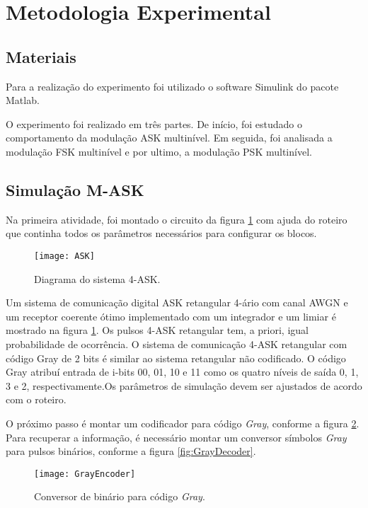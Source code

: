\newpage
\section{Metodologia Experimental}

\subsection{Materiais}

Para a realização do experimento foi utilizado o software Simulink do pacote Matlab.

O experimento foi realizado em três partes. De início, foi estudado o comportamento da modulação ASK multinível. Em seguida, foi analisada a modulação FSK multinível e por ultimo, a modulação PSK multinível.

\subsection{Simulação M-ASK}
Na primeira atividade, foi montado o circuito da figura \ref{fig:ASK} com ajuda do roteiro que continha todos os parâmetros necessários para configurar os blocos.

\begin{figure}[H]
    \centering
    \texttt{[image: ASK]}
    \caption{Diagrama do sistema 4-ASK.}
    \label{fig:ASK}
\end{figure}

Um sistema de comunicação digital ASK retangular 4-ário com canal AWGN e um receptor coerente ótimo implementado com um integrador e um limiar é mostrado na figura \ref{fig:ASK}. Os pulsos 4-ASK retangular tem, a priori, igual probabilidade de ocorrência.
O sistema de comunicação 4-ASK retangular com código Gray de 2 bits é similar ao sistema retangular não codificado. O código Gray atribuí entrada de i-bits 00, 01, 10 e 11 como os quatro níveis de saída 0, 1, 3 e 2, respectivamente.Os parâmetros de simulação devem ser ajustados de acordo com o roteiro.

O próximo passo é montar um codificador para código \textit{Gray}, conforme a figura \ref{fig:GrayEncoder}.
Para recuperar a informação, é necessário montar um conversor símbolos \textit{Gray} para pulsos binários, conforme a figura \ref{fig:GrayDecoder}.

\begin{figure}[H]
    \centering
    \texttt{[image: GrayEncoder]}
    \caption{Conversor de binário para código \textit{Gray}.}
    \label{fig:GrayEncoder}
\end{figure}

